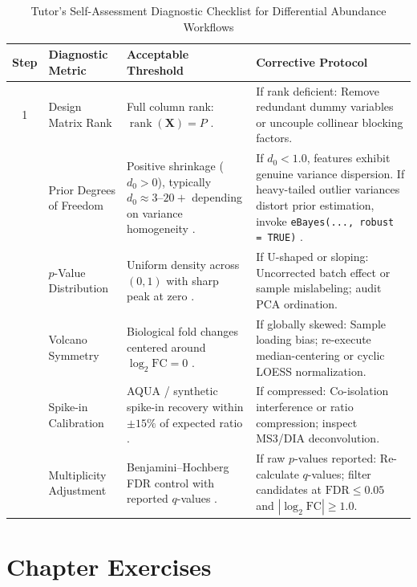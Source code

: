 \documentclass[11pt,twoside,openright]{book}
\begin{document}
\begin{table}[ht]
\centering
\caption{Tutor's Self-Assessment Diagnostic Checklist for Differential Abundance Workflows}
\label{tab:diff_checklist}
\small
\begin{tabularx}{\textwidth}{c p{3.8cm} p{4.2cm} X}
\toprule
\textbf{Step} & \textbf{Diagnostic Metric} & \textbf{Acceptable Threshold} & \textbf{Corrective Protocol} \\
\midrule
1 & Design Matrix Rank & Full column rank: $\operatorname{rank}(\mathbf{X}) = P$ \cite{smyth2004linear}. & If rank deficient: Remove redundant dummy variables or uncouple collinear blocking factors. \\
\addlinespace
2 & Prior Degrees of Freedom & Positive shrinkage ($d_0 > 0$), typically $d_0 \approx 3$--$20+$ depending on variance homogeneity \cite{smyth2004linear}. & If $d_0 < 1.0$, features exhibit genuine variance dispersion. If heavy-tailed outlier variances distort prior estimation, invoke \texttt{eBayes(..., robust = TRUE)} \cite{phipson2016robust}. \\
\addlinespace
3 & $p$-Value Distribution & Uniform density across $(0, 1)$ with sharp peak at zero \cite{efron2004large}. & If U-shaped or sloping: Uncorrected batch effect or sample mislabeling; audit PCA ordination. \\
\addlinespace
4 & Volcano Symmetry & Biological fold changes centered around $\log_2 \text{FC} = 0$ \cite{bruderer2015extending}. & If globally skewed: Sample loading bias; re-execute median-centering or cyclic LOESS normalization. \\
\addlinespace
5 & Spike-in Calibration & AQUA / synthetic spike-in recovery within $\pm 15\%$ of expected ratio \cite{navarro2016multicenter}. & If compressed: Co-isolation interference or ratio compression; inspect MS3/DIA deconvolution. \\
\addlinespace
6 & Multiplicity Adjustment & Benjamini--Hochberg FDR control with reported $q$-values \cite{benjamini1995controlling}. & If raw $p$-values reported: Re-calculate $q$-values; filter candidates at $\text{FDR} \le 0.05$ and $|\log_2 \text{FC}| \ge 1.0$. \\
\bottomrule
\end{tabularx}
\end{table}

\section{Chapter Exercises}
\end{document}
